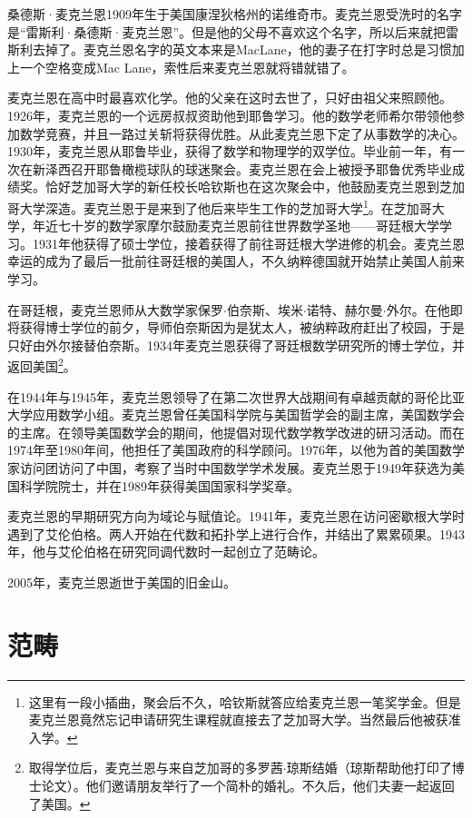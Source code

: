 \documentclass{article}
\begin{document}
桑德斯·麦克兰恩1909年生于美国康涅狄格州的诺维奇市。麦克兰恩受洗时的名字是“雷斯利·桑德斯·麦克兰恩”。但是他的父母不喜欢这个名字，所以后来就把雷斯利去掉了。麦克兰恩名字的英文本来是MacLane，他的妻子在打字时总是习惯加上一个空格变成Mac Lane，索性后来麦克兰恩就将错就错了。

麦克兰恩在高中时最喜欢化学。他的父亲在这时去世了，只好由祖父来照顾他。1926年，麦克兰恩的一个远房叔叔资助他到耶鲁学习。他的数学老师希尔带领他参加数学竞赛，并且一路过关斩将获得优胜。从此麦克兰恩下定了从事数学的决心。1930年，麦克兰恩从耶鲁毕业，获得了数学和物理学的双学位。毕业前一年，有一次在新泽西召开耶鲁橄榄球队的球迷聚会。麦克兰恩在会上被授予耶鲁优秀毕业成绩奖\cite{Wiki-Mac-Lane}。恰好芝加哥大学的新任校长哈钦斯也在这次聚会中，他鼓励麦克兰恩到芝加哥大学深造。麦克兰恩于是来到了他后来毕生工作的芝加哥大学\footnote{这里有一段小插曲，聚会后不久，哈钦斯就答应给麦克兰恩一笔奖学金。但是麦克兰恩竟然忘记申请研究生课程就直接去了芝加哥大学。当然最后他被获准入学。}。在芝加哥大学，年近七十岁的数学家摩尔鼓励麦克兰恩前往世界数学圣地——哥廷根大学学习。1931年他获得了硕士学位，接着获得了前往哥廷根大学进修的机会。麦克兰恩幸运的成为了最后一批前往哥廷根的美国人，不久纳粹德国就开始禁止美国人前来学习。

在哥廷根，麦克兰恩师从大数学家保罗$\cdot$伯奈斯、埃米$\cdot$诺特、赫尔曼$\cdot$外尔。在他即将获得博士学位的前夕，导师伯奈斯因为是犹太人，被纳粹政府赶出了校园，于是只好由外尔接替伯奈斯。1934年麦克兰恩获得了哥廷根数学研究所的博士学位，并返回美国\footnote{取得学位后，麦克兰恩与来自芝加哥的多罗茜$\cdot$琼斯结婚（琼斯帮助他打印了博士论文）。他们邀请朋友举行了一个简朴的婚礼。不久后，他们夫妻一起返回了美国。}。

在1944年与1945年，麦克兰恩领导了在第二次世界大战期间有卓越贡献的哥伦比亚大学应用数学小组。麦克兰恩曾任美国科学院与美国哲学会的副主席，美国数学会的主席。在领导美国数学会的期间，他提倡对现代数学教学改进的研习活动。而在1974年至1980年间，他担任了美国政府的科学顾问。1976年，以他为首的美国数学家访问团访问了中国，考察了当时中国数学学术发展。麦克兰恩于1949年获选为美国科学院院士，并在1989年获得美国国家科学奖章。

麦克兰恩的早期研究方向为域论与赋值论。1941年，麦克兰恩在访问密歇根大学时遇到了艾伦伯格。两人开始在代数和拓扑学上进行合作，并结出了累累硕果。1943年，他与艾伦伯格在研究同调代数时一起创立了范畴论。

2005年，麦克兰恩逝世于美国的旧金山。

\section{范畴}
\end{document}
